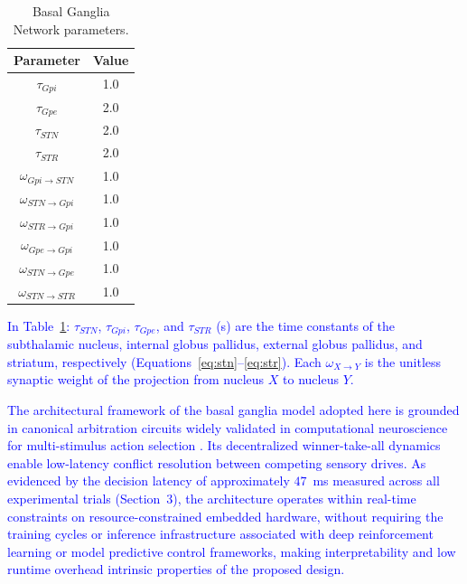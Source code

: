 \documentclass[preprint,12pt]{elsarticle}
\newcommand{\revblue}[1]{\textcolor{blue}{#1}}
\begin{document}
\begin{table}[t]
\centering
\caption{Basal Ganglia Network parameters.}
\begin{tabular}{|c|c|}
\hline
\textbf{Parameter} & \textbf{Value} \\ \hline
$\tau_{Gpi}$ & 1.0 \\ \hline
$\tau_{Gpe}$ & 2.0 \\ \hline
$\tau_{STN}$ & 2.0 \\ \hline
$\tau_{STR}$ & 2.0 \\ \hline
$\omega_{Gpi\rightarrow STN}$ & 1.0 \\ \hline
$\omega_{STN\rightarrow Gpi}$ & 1.0 \\ \hline
$\omega_{STR\rightarrow Gpi}$ & 1.0 \\ \hline
$\omega_{Gpe\rightarrow Gpi}$ & 1.0 \\ \hline
$\omega_{STN\rightarrow Gpe}$ & 1.0 \\ \hline
$\omega_{STN\rightarrow STR}$ & 1.0 \\ \hline
\end{tabular}
\label{table:Ganglia}
\end{table}
\revblue{In Table~\ref{table:Ganglia}: $\tau_{STN}$, $\tau_{Gpi}$, $\tau_{Gpe}$, and $\tau_{STR}$ (s) are the time constants of the subthalamic nucleus, internal globus pallidus, external globus pallidus, and striatum, respectively (Equations~\eqref{eq:stn}--\eqref{eq:str}).
Each $\omega_{X\rightarrow Y}$ is the unitless synaptic weight of the projection from nucleus $X$ to nucleus $Y$.}

\revblue{The architectural framework of the basal ganglia model adopted here is grounded in canonical arbitration circuits widely validated in computational neuroscience for multi-stimulus action selection \citep{Gurney2001a,Gurney2001b,Prescott2006Robot}. Its decentralized winner-take-all dynamics enable low-latency conflict resolution between competing sensory drives. As evidenced by the decision latency of approximately $47$~ms measured across all experimental trials (Section~3), the architecture operates within real-time constraints on resource-constrained embedded hardware, without requiring the training cycles or inference infrastructure associated with deep reinforcement learning or model predictive control frameworks, making interpretability and low runtime overhead intrinsic properties of the proposed design.}
\end{document}
